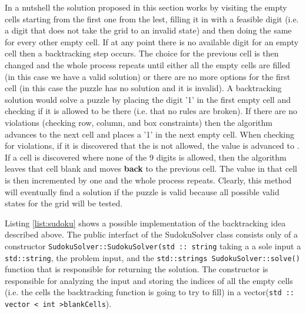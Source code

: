 In a nutshell the solution proposed in this section works by visiting the empty cells starting from
the first one from the lest, filling it in with a feasible digit (i.e. a digit that does not take the
grid to an invalid state) and then doing the same for every other empty cell. If at
any point there is no available digit for an empty cell then a backtracking step occurs. The
choice for the previous cell is then changed and the whole process repeats until either all the
empty cells are filled (in this case we have a valid solution) or there are no more options for the
first cell (in this case the puzzle has no solution and it is invalid). A backtracking solution
would solve a puzzle by placing the digit '1' in the first empty cell and checking if it is allowed
to be there  (i.e. that no rules are broken). If there are no violations (checking row, column, and box
constraints) then the algorithm advances to the next cell and places a '1' in the next empty cell.
When checking for violations, if it is discovered that the  is not allowed, the value is advanced
to . If a cell is discovered where none of the 9 digits is allowed, then the algorithm leaves
that cell blank and moves \textbf{back} to the previous cell. The value in that cell is then
incremented by one and the whole process repeats. Clearly, this method will eventually find a
solution if the puzzle is valid because all possible valid states for the grid will be tested. 


Listing \ref{list:sudoku} shows a possible implementation of the backtracking idea described above.
The public interfact of the SudokuSolver class consists only of a constructor
\lstinline[columns=fixed]{SudokuSolver::SudokuSolver(std :: string} taking a a sole input a
\lstinline[columns=fixed]{std::string}, the problem input, and the
\lstinline[columns=fixed]{std::strings SudokuSolver::solve()} function that is responsible for
returning the solution. The constructor is responsible for analyzing the input and storing the indices of all the empty
cells (i.e. the cells the backtracking function is going to try to fill) in a
vector(\lstinline[columns=fixed]{std :: vector < int >blankCells}).

